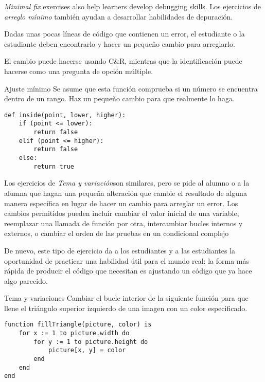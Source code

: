 \emph{Minimal fix} exercises also help learners develop debugging skills.
Los ejercicios de \emph{arreglo mínimo} también ayudan a desarrollar habilidades de depuración.

Dadas unas pocas líneas de código que contienen un error, el estudiante o la estudiante deben encontrarlo y hacer un pequeño cambio para arreglarlo.

El cambio puede hacerse usando C\&R,
mientras que la identificación puede hacerse como una pregunta de opción múltiple.


\begin{aside}{Ajuste mínimo}
 Se asume que esta función comprueba 
 si un número se encuentra dentro de un rango.
 Haz un pequeño cambio para que realmente lo haga.

\begin{verbatim}
def inside(point, lower, higher):
    if (point <= lower):
        return false
    elif (point <= higher):
        return false
    else:
        return true
\end{verbatim}
\end{aside}

Los ejercicios de \emph{Tema y variación}son similares, 
pero se pide al alumno o a la alumna que hagan una pequeña alteración que cambie el resultado de alguna manera específica 
en lugar de hacer un cambio para arreglar un error.
Los cambios permitidos pueden incluir cambiar el valor inicial de una variable, 
reemplazar una llamada de función por otra, 
intercambiar bucles internos y externos,
o cambiar el orden de las pruebas en un condicional complejo

De nuevo,
este tipo de ejercicio da a los estudiantes y a las estudiantes la oportunidad de practicar una habilidad útil para el mundo real:
la forma más rápida de producir el código que necesitan 
es ajustando un código que ya hace algo parecido.

\begin{aside}{Tema y variaciones}
  Cambiar el bucle interior de la siguiente 
  función para que llene el triángulo superior izquierdo de una imagen
  con un color especificado.

\begin{verbatim}
function fillTriangle(picture, color) is
    for x := 1 to picture.width do
        for y := 1 to picture.height do
            picture[x, y] = color
        end
    end
end
\end{verbatim}
\end{aside}

